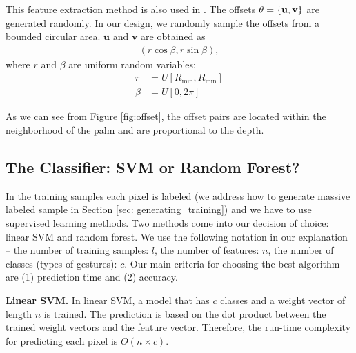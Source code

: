 This feature extraction method is also used in \cite{shotton2011}. The offsets $\theta=\{\bf{u}, \bf{v} \}$ are generated randomly. In our design, we randomly sample the offsets from a bounded circular area. $\textbf{u}$ and $\textbf{v}$ are obtained as
\begin{align}
\label{enq: offest}
 (r \cos \beta, r \sin \beta),
\end{align}
where $r$ and $\beta$ are uniform random variables:
\begin{align}
 r &= U[R_{\text{min}}, R_{\text{min}}] \\
 \beta &= U[0, 2\pi]
\end{align}

As we can see from Figure \ref{fig:offset}, the offset pairs are located within the neighborhood of the palm and are proportional to the depth.

\subsection{The Classifier: SVM or Random Forest?}

In the training samples each pixel is labeled (we address how to generate massive labeled sample in Section \ref{sec: generating_training}) and we have to use supervised learning methods. Two methods come into our decision of choice: linear SVM and random forest. We use the following notation in our explanation -- the number of training samples: $l$, the number of features: $n$, the number of classes (types of gestures): $c$. Our main criteria for choosing the best algorithm are (1) prediction time and (2) accuracy.

\textbf{Linear SVM.} In linear SVM, a model that has $c$ classes and a weight vector of length $n$ is trained. The prediction is based on the dot product between the trained weight vectors and the feature vector. Therefore, the run-time complexity for predicting each pixel is $O(n\times c)$.

